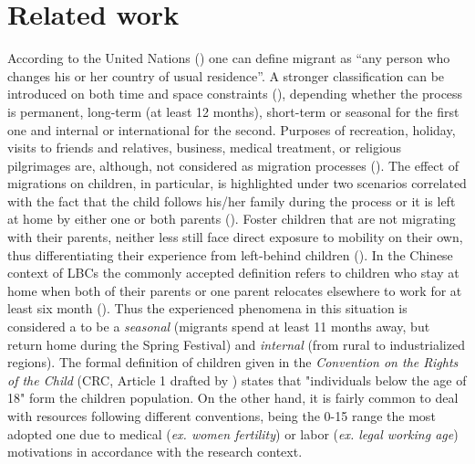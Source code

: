 \section{Related work}
\label{related-work}



According to the United Nations (\cite{united1998recommendations}) one can define migrant as “any person who changes his or her country of usual residence”. A stronger classification can be introduced on both time and space constraints (\cite{rossi2008impact}), depending whether the process is permanent, long-term (at least 12 months), short-term or seasonal for the first one and internal or international for the second. Purposes of recreation, holiday, visits to friends and relatives, business, medical treatment, or religious pilgrimages are, although, not considered as migration processes (\cite{united1998recommendations}). The effect of migrations on children, in particular, is highlighted under two scenarios correlated with the fact that the child follows his/her family during the process or it is left at home by either one or both parents (\cite{rossi2008impact}). Foster children that are not migrating with their parents, neither less still face direct exposure to mobility on their own, thus differentiating their experience from left-behind children (\cite{pilon2003foster}). In the Chinese context of LBCs the commonly accepted definition refers to children who stay at home when both of their parents or one parent relocates elsewhere to work for at least six month (\cite{lu2011left}). Thus the experienced phenomena in this situation is considered a to be a \textit{seasonal} (migrants spend at least 11 months away, but return home during the Spring Festival) and \textit{internal} (from rural to industrialized regions). The formal definition of children given in the \textit{Convention on the Rights of the Child} (CRC, Article 1 drafted by \cite{unicef1989convention}) states that "individuals below the age of 18" form the children population. On the other hand, it is fairly common to deal with resources following different conventions, being the 0-15 range the most adopted one due to medical (\textit{ex. women fertility}) or labor (\textit{ex. legal working age}) motivations in accordance with the research context.

